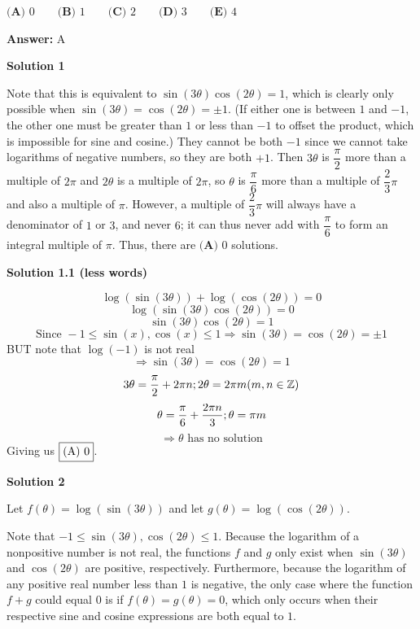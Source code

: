 \begin{enumerate}
 $\textbf{(A) }0 \qquad \textbf{(B) }1 \qquad \textbf{(C) }2 \qquad \textbf{(D) }3 \qquad \textbf{(E) }4 \qquad$

 \textbf{Answer: }A



\textbf{Solution 1}

Note that this is equivalent to $\sin(3\theta)\cos(2\theta)=1$, which is clearly only possible when $\sin(3\theta)=\cos(2\theta)=\pm1$. (If either one is between $1$ and $-1$, the other one must be greater than $1$ or less than $-1$ to offset the product, which is impossible for sine and cosine.) They cannot be both $-1$ since we cannot take logarithms of negative numbers, so they are both $+1$. Then $3\theta$ is $\dfrac\pi2$ more than a multiple of $2\pi$ and $2\theta$ is a multiple of $2\pi$, so $\theta$ is $\dfrac\pi6$ more than a multiple of $\dfrac23\pi$ and also a multiple of $\pi$. However, a multiple of $\dfrac23\pi$ will always have a denominator of $1$ or $3$, and never $6$; it can thus never add with $\dfrac\pi6$ to form an integral multiple of $\pi$. Thus, there are $\boxed{\textbf{(A) }0}$ solutions. 

 



\textbf{Solution 1.1 (less words)}


 \[\log(\sin(3\theta))+\log(\cos(2\theta))=0\]
 \[\log(\sin(3\theta)\cos(2\theta))=0\]
 \[\sin(3\theta)\cos(2\theta)=1\]
 \[\text{Since } -1\le \sin(x),\cos(x)\le 1 \Rightarrow \sin(3\theta)=\cos(2\theta)= \pm1\]BUT note that $\log(-1)$ is not real
 \[\Rightarrow \sin(3\theta)=\cos(2\theta)= 1\]
 \[3\theta=\frac{\pi}{2}+2\pi n; \space 2\theta=2\pi m \space   (m,n \in \mathbb{Z})\]
 \[\theta=\frac{\pi}{6}+\frac{2\pi n}{3}; \space \theta=\pi m\]
 \[\Rightarrow \theta\text { has no solution}\]Giving us $\fbox{(A) 0}$.

 



\textbf{Solution 2}

Let $f(\theta)=\log(\sin(3\theta))$ and let $g(\theta)=\log(\cos(2\theta))$.

 Note that $-1\leq\sin(3\theta),\cos(2\theta)\leq1$. Because the logarithm of a nonpositive number is not real, the functions $f$ and $g$ only exist when $\sin(3\theta)$ and $\cos(2\theta)$ are positive, respectively. Furthermore, because the logarithm of any positive real number less than $1$ is negative, the only case where the function $f+g$ could equal $0$ is if $f(\theta)=g(\theta)=0$, which only occurs when their respective sine and cosine expressions are both equal to $1$.


\end{enumerate}
